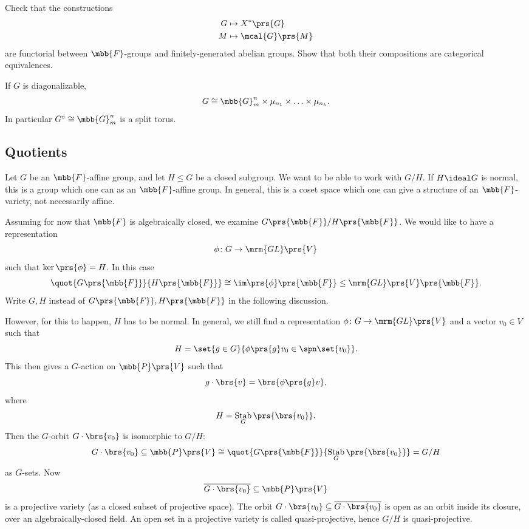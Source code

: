 \documentclass[10pt,a4paper,twoside,openany,hidelinks]{book}
\DeclareMathOperator{\Stab}{Stab}
\begin{document}
\begin{exercise}
Check that the constructions
\begin{align*}
G &\mapsto X^*\prs{G} \\
M &\mapsto \mcal{G}\prs{M}
\end{align*}
are functorial between $\mbb{F}$-groups and finitely-generated abelian groups.
Show that both their compositions are categorical equivalences.
\end{exercise}

\begin{corollary}
If $G$ is diagonalizable,
\[G \cong \mbb{G}_m^n \times \mu_{n_1} \times \ldots \times \mu_{n_k} \text{.}\]
In particular $G^{\circ} \cong \mbb{G}_m^n$ is a split torus.
\end{corollary}

\subsection{Quotients}

Let $G$ be an $\mbb{F}$-affine group, and let $H \leq G$ be a closed subgroup. We want to be able to work with $G/H$. If $H \ideal G$ is normal, this is a group which one can as an $\mbb{F}$-affine group. In general, this is a coset space which one can give a structure of an $\mbb{F}$-variety, not necessarily affine.

Assuming for now that $\mbb{F}$ is algebraically closed, we examine $G\prs{\mbb{F}} / H\prs{\mbb{F}}$.
We would like to have a representation
\[\phi \colon G \to \mrm{GL}\prs{V}\]
such that $\ker\prs{\phi} = H$.
In this case \[\quot{G\prs{\mbb{F}}}{H\prs{\mbb{F}}} \cong \im\prs{\phi}\prs{\mbb{F}} \leq \mrm{GL}\prs{V}\prs{\mbb{F}} \text{.}\]
Write $G,H$ instead of $G\prs{\mbb{F}}, H\prs{\mbb{F}}$ in the following discussion.

However, for this  to happen, $H$ has to be normal.
In general, we still find a representation $\phi \colon G \to \mrm{GL}\prs{V}$ and a vector $v_0 \in V$ such that
\[H = \set{g \in G}{\phi\prs{g} v_0 \in \spn\set{v_0}} \text{.}\]
This then gives a $G$-action on $\mbb{P}\prs{V}$ such that
\[g \cdot \brs{v} = \brs{\phi\prs{g} v} \text{,}\]
where
\[H = \Stab_G\prs{\brs{v_0}} \text{.}\]
Then the $G$-orbit $G \cdot \brs{v_0}$ is isomorphic to $G/H$: \[G \cdot \brs{v_0} \subseteq \mbb{P}\prs{V} \cong \quot{G\prs{\mbb{F}}}{\Stab_G\prs{\brs{v_0}}} = G/H\] as $G$-sets.
Now \[\overline{G \cdot \brs{v_0}} \subseteq \mbb{P}\prs{V}\]
is a projective variety (as a closed subset of projective space).
The orbit $G \cdot \brs{v_0} \subseteq \overline{G \cdot \brs{v_0}}$ is open as an orbit inside its closure, over an algebraically-closed field. An open set in a projective variety is called quasi-projective, hence $G/H$ is quasi-projective.
\end{document}
